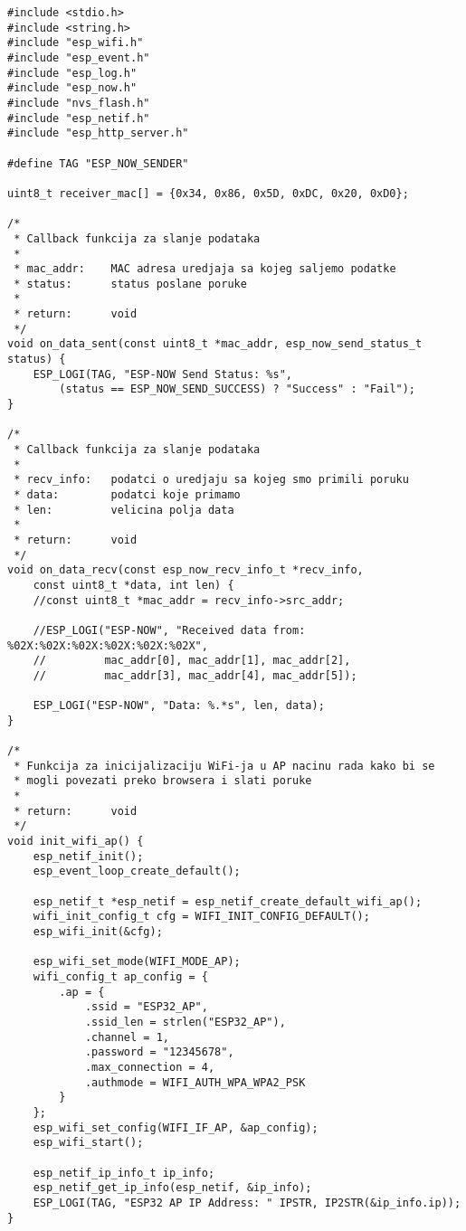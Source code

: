\documentclass[seminarskirad]{fer}
\begin{document}
\begin{lstlisting}[caption=ESP-NOW sender]
#include <stdio.h>
#include <string.h>
#include "esp_wifi.h"
#include "esp_event.h"
#include "esp_log.h"
#include "esp_now.h"
#include "nvs_flash.h"
#include "esp_netif.h"
#include "esp_http_server.h"

#define TAG "ESP_NOW_SENDER"

uint8_t receiver_mac[] = {0x34, 0x86, 0x5D, 0xDC, 0x20, 0xD0};

/*
 * Callback funkcija za slanje podataka
 * 
 * mac_addr:    MAC adresa uredjaja sa kojeg saljemo podatke
 * status:      status poslane poruke
 * 
 * return:      void
 */
void on_data_sent(const uint8_t *mac_addr, esp_now_send_status_t status) {
    ESP_LOGI(TAG, "ESP-NOW Send Status: %s", 
        (status == ESP_NOW_SEND_SUCCESS) ? "Success" : "Fail");
}

/*
 * Callback funkcija za slanje podataka
 * 
 * recv_info:   podatci o uredjaju sa kojeg smo primili poruku
 * data:        podatci koje primamo
 * len:         velicina polja data
 * 
 * return:      void
 */
void on_data_recv(const esp_now_recv_info_t *recv_info, 
    const uint8_t *data, int len) {
    //const uint8_t *mac_addr = recv_info->src_addr;

    //ESP_LOGI("ESP-NOW", "Received data from: %02X:%02X:%02X:%02X:%02X:%02X",
    //         mac_addr[0], mac_addr[1], mac_addr[2], 
    //         mac_addr[3], mac_addr[4], mac_addr[5]);

    ESP_LOGI("ESP-NOW", "Data: %.*s", len, data);
}

/*
 * Funkcija za inicijalizaciju WiFi-ja u AP nacinu rada kako bi se 
 * mogli povezati preko browsera i slati poruke
 * 
 * return:      void
 */
void init_wifi_ap() {
    esp_netif_init();
    esp_event_loop_create_default();

    esp_netif_t *esp_netif = esp_netif_create_default_wifi_ap();
    wifi_init_config_t cfg = WIFI_INIT_CONFIG_DEFAULT();
    esp_wifi_init(&cfg);

    esp_wifi_set_mode(WIFI_MODE_AP);
    wifi_config_t ap_config = {
        .ap = {
            .ssid = "ESP32_AP",
            .ssid_len = strlen("ESP32_AP"),
            .channel = 1,
            .password = "12345678",
            .max_connection = 4,
            .authmode = WIFI_AUTH_WPA_WPA2_PSK
        }
    };
    esp_wifi_set_config(WIFI_IF_AP, &ap_config);
    esp_wifi_start();

    esp_netif_ip_info_t ip_info;
    esp_netif_get_ip_info(esp_netif, &ip_info);
    ESP_LOGI(TAG, "ESP32 AP IP Address: " IPSTR, IP2STR(&ip_info.ip));
}


\end{lstlisting}
\end{document}
